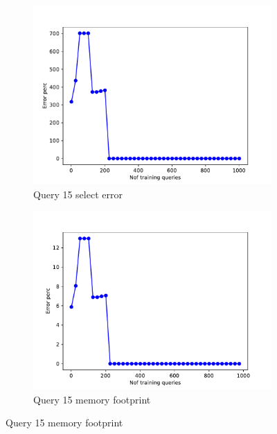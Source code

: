 \begin{figure}[htb!]
  \begin{subfigure}[t]{0.5\textwidth}
    \includegraphics[scale=0.4]{figs/airtraffic/airtraffic_sel15_1_error.pdf}
    \caption{Query 15 select error}
    \label{fig:sel15}
  \end{subfigure}
  \begin{subfigure}[t]{0.5\textwidth}
    \includegraphics[scale=0.4]{figs/airtraffic/airtraffic_q15_1_memerror.pdf}
    \caption{Query 15 memory footprint}
    \label{fig:mem15}
   \end{subfigure}

\end{figure}

